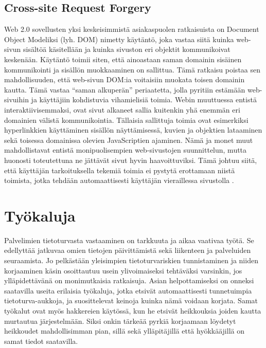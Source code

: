 \subsection{Cross-site Request Forgery}

Web 2.0 sovellusten yksi keskeisimmistä asiakaspuolen ratkaisuista on Document Object Modeliksi (lyh. DOM) nimetty käytäntö, joka vastaa siitä kuinka
web-sivun sisältöä käsitellään ja kuinka sivuston eri objektit kommunikoivat keskenään. Käytäntö toimii siten, että ainoastaan saman domainin 
sisäinen kommunikointi ja sisällön muokkaaminen on sallittua. Tämä ratkaisu poistaa sen mahdollisuuden, että web-sivun DOM:ia voitaisiin muokata toisen
domainin kautta. Tämä vastaa ``saman alkuperän'' periaatetta, jolla pyritiin estämään web-sivuihin ja käyttäjiin kohdistuvia vihamielisiä toimia. 
Webin muuttuessa entistä interaktiivisemmaksi, ovat sivut alkaneet sallia kuitenkin yhä enemmän eri domainien välistä kommunikointia. Tällaisia 
sallittuja toimia ovat esimerkiksi hyperlinkkien käyttäminen sisällön näyttämisessä, kuvien ja objektien lataaminen sekä toisessa domainissa olevien 
JavaScriptien ajaminen. Nämä ja monet muut mahdollistavat entistä monipuolisempien web-sivustojen suunnittelun, mutta huonosti toteutettuna ne jättävät
sivut hyvin haavoittuviksi. Tämä johtuu siitä, että käyttäjän tarkoituksella tekemiä toimia ei pystytä erottamaan niistä toimista, jotka tehdään 
automaattisesti käyttäjän vieraillessa sivustolla \cite{WEB2}.




\section{Työkaluja}
Palvelimien tietoturvasta vastaaminen on tarkkuuta ja aikaa vaativaa työtä. Se edellyttää jatkuvaa omien tietojen
päivittämistä sekä liikenteen ja palveluiden seuraamista. Jo pelkästään yleisimpien tietoturvariskien tunnistaminen ja
niiden korjaaminen käsin osoittautuu usein ylivoimaiseksi tehtäväksi varsinkin, jos ylläpidettävänä on monimutkaisia
ratkaisuja. Asian helpottamiseksi on onneksi saatavilla useita erilaisia työkaluja, jotka etsivät automaattisesti
tunnetuimpia tietoturva-aukkoja, ja suosittelevat keinoja kuinka nämä voidaan korjata. Samat työkalut ovat myös 
hakkereien käytössä, kun he etsivät heikkouksia joiden kautta murtautua järjestelmään. Siksi onkin tärkeää pyrkiä
korjaamaan löydetyt heikkoudet mahdollisimman pian, sillä sekä ylläpitäjillä että hyökkääjillä on samat tiedot saatavilla. 





